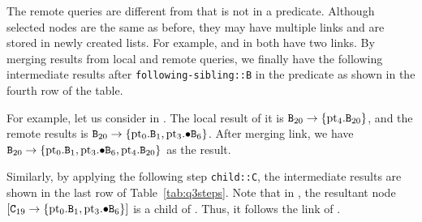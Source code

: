 The remote queries are different from that is not in a predicate. Although
selected nodes are the same as before, they may have multiple links and are
stored in newly created lists. For example,   and  in 
both have two links. By merging results from local and remote queries, we
finally have the following intermediate results after
\texttt{following-sibling::B} in the predicate as shown in the fourth row of the
table.

For example, let us consider  in . The local result of it is
$\hbox{\texttt{B$_{20}$}}\to\{\hbox{\textrm{pt}$_{4}$}.\hbox{\texttt{B$_{20}$}}\}$, and the remote results is
$\hbox{\texttt{B$_{20}$}}\to\{\hbox{\textrm{pt}$_{0}$}.\hbox{\texttt{B$_{1}$}}, \hbox{\textrm{pt}$_{3}$}.\hbox{$\bullet$\texttt{B$_{6}$}}\}$. After merging link,  we
have $\hbox{\texttt{B$_{20}$}}\to\{\hbox{\textrm{pt}$_{0}$}.\hbox{\texttt{B$_{1}$}}, \hbox{\textrm{pt}$_{3}$}.\hbox{$\bullet$\texttt{B$_{6}$}}, \hbox{\textrm{pt}$_{4}$}.\hbox{\texttt{B$_{20}$}}\}$ as
the result.

Similarly, by applying the following step \texttt{child::C}, the intermediate
results are shown in the last row of Table~\ref{tab:q3steps}. Note that in ,
the resultant node $ [\hbox{\texttt{C$_{19}$}}\to\{\hbox{\textrm{pt}$_{0}$}.\hbox{\texttt{B$_{1}$}}, \hbox{\textrm{pt}$_{3}$}.\hbox{$\bullet$\texttt{B$_{6}$}}\}] $ is
a child of . Thus, it follows the link of .

